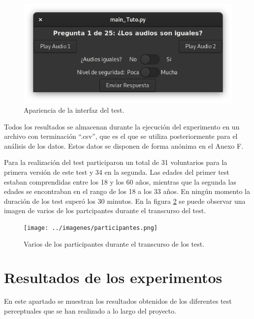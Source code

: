 \documentclass[11pt,a4paper]{book}
\begin{document}
                    \begin{figure}[H]
                        \includegraphics[scale=0.6]{../imagenes/interFin.png}
			            \centering
			            \caption{Apariencia de la interfaz del test.}
			            \label{fig:interfazTestFin}
                    \end{figure}
                
                    Todos los resultados se almacenan durante la ejecución del experimento en un archivo con terminación ``.csv'', que es el que se utiliza posteriormente para el análisis de los datos. Estos datos se disponen de forma anónima en el Anexo F.
                
                    Para la realización del test participaron un total de 31 voluntarios para la primera versión de este test y 34 en la segunda. Las edades del primer test estaban comprendidas entre los 18 y los 60 años, mientras que la segunda las edades se encontraban en el rango de los 18 a los 33 años. En ningún momento la duración de los test superó los 30 minutos. En la figura \ref{fig:participantes} se puede observar una imagen de varios de los partcipantes durante el transcurso del test.
                
                    \begin{figure}[H]
                        \texttt{[image: ../imagenes/participantes.png]}
			            \centering
			            \caption{Varios de los participantes durante el transcurso de los test.}
			            \label{fig:participantes}
                    \end{figure}
                    
\chapter{Resultados de los experimentos}
    En este apartado se muestran los resultados obtenidos de los diferentes test perceptuales que se han realizado a lo largo del proyecto. 
\end{document}
